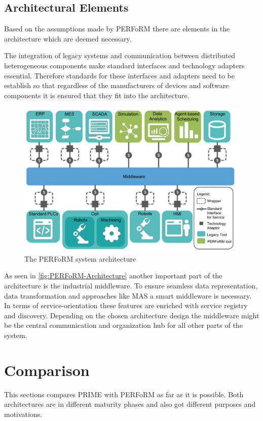 \documentclass[conference,compsoc,hidelinks]{IEEEtran}
\begin{document}
\subsection{Architectural Elements}
Based on the assumptions made by PERFoRM there are elements in the architecture which are deemed necessary.

The integration of legacy systems and communication between distributed heterogeneous components make standard interfaces and technology adapters essential.
Therefore standards for these interfaces and adapters need to be establish so that regardless of the manufacturers of devices and software components it is ensured that they fit into the architecture.

\begin{figure}[ht]
	\includegraphics[width=\columnwidth]{img/PERFoRM-Architecture.png}
	\caption{The PERFoRM system architecture\cite{SpecPERFoRM}}
	\label{fig:PERFoRM-Architecture}
\end{figure}

As seen in \autoref{fig:PERFoRM-Architecture} another important part of the architecture is the industrial middleware. To ensure seamless data representation, data transformation and approaches like MAS a smart middleware is necessary. In terms of service-orientation these features are enriched with service registry and discovery. Depending on the chosen architecture design the middleware might be the central communication and organization hub for all other parts of the system.

\section{Comparison} \label{sec:comparison} %
This sections compares PRIME with PERFoRM as far as it is possible. Both architectures are in different maturity phases and also got different purposes and motivations.
\end{document}

